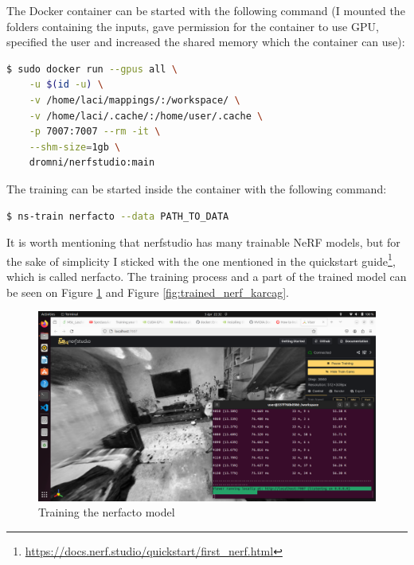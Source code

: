 The Docker container can be started with the following command (I mounted the folders containing the inputs, gave permission for the container to use GPU, specified the user and increased the shared memory which the container can use):

\begin{lstlisting}[language=bash,frame=single,float=!ht]
$ sudo docker run --gpus all \
    -u $(id -u) \
    -v /home/laci/mappings/:/workspace/ \
    -v /home/laci/.cache/:/home/user/.cache \
    -p 7007:7007 --rm -it \
    --shm-size=1gb \
    dromni/nerfstudio:main
\end{lstlisting}

The training can be started inside the container with the following command:
\begin{lstlisting}[language=bash,frame=single,float=!ht]
$ ns-train nerfacto --data PATH_TO_DATA
\end{lstlisting}
It is worth mentioning that nerfstudio has many trainable NeRF models, but for the sake of simplicity I sticked with the one mentioned in the quickstart guide\footnote{\url{https://docs.nerf.studio/quickstart/first_nerf.html}}, which is called nerfacto. The training process and a part of the trained model can be seen on Figure \ref{fig:training_nerf_karcag} and Figure \ref{fig:trained_nerf_karcag}.

\begin{figure}[H]
	\centering
	\includegraphics[width=150mm, keepaspectratio]{figures/nerfstudio.png}
	\caption{Training the nerfacto model}
	\label{fig:training_nerf_karcag}
\end{figure}

